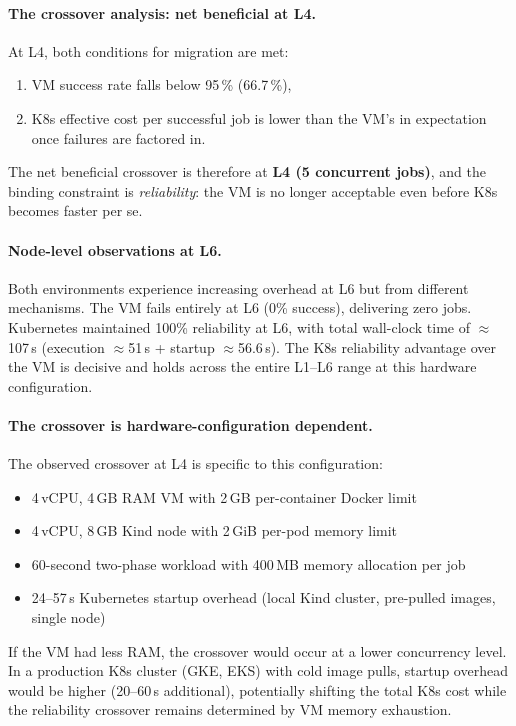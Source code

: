 \paragraph{The crossover analysis: net beneficial at L4.}
At L4, both conditions for migration are met:
\begin{enumerate}
  \item VM success rate falls below 95\,\% (66.7\,\%),
  \item K8s effective cost per successful job is lower than the VM's in expectation once failures are factored in.
\end{enumerate}
The net beneficial crossover is therefore at \textbf{L4 (5 concurrent jobs)}, and the binding constraint is \emph{reliability}: the VM is no longer acceptable even before K8s becomes faster per se.

\paragraph{Node-level observations at L6.}
Both environments experience increasing overhead at L6 but from different mechanisms.
The VM fails entirely at L6 (0\% success), delivering zero jobs.
Kubernetes maintained 100\% reliability at L6, with total wall-clock time of $\approx$107\,s (execution $\approx$51\,s + startup $\approx$56.6\,s).
The K8s reliability advantage over the VM is decisive and holds across the entire L1--L6 range at this hardware configuration.

\paragraph{The crossover is hardware-configuration dependent.}
The observed crossover at L4 is specific to this configuration:
\begin{itemize}
  \item 4\,vCPU, 4\,GB RAM VM with 2\,GB per-container Docker limit
  \item 4\,vCPU, 8\,GB Kind node with 2\,GiB per-pod memory limit
  \item 60-second two-phase workload with 400\,MB memory allocation per job
  \item 24--57\,s Kubernetes startup overhead (local Kind cluster, pre-pulled images, single node)
\end{itemize}
If the VM had less RAM, the crossover would occur at a lower concurrency level.
In a production K8s cluster (GKE, EKS) with cold image pulls, startup overhead would be higher (20--60\,s additional), potentially shifting the total K8s cost while the reliability crossover remains determined by VM memory exhaustion.

